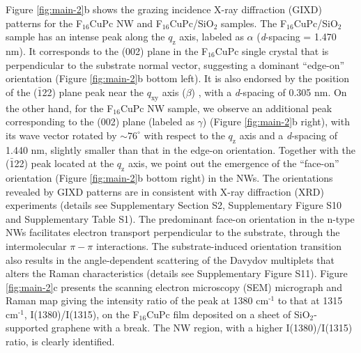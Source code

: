 \documentclass[journal=nalefd,manuscript=letter,email=true,hyperref=true,keywords=true]{achemso}
\begin{document}
Figure \ref{fig:main-2}b shows the grazing incidence X-ray diffraction
(GIXD) patterns for the F\(_{\text{16}}\)CuPc NW and F\(_{\text{16}}\)CuPc/SiO\(_{\text{2}}\)
samples. The F\(_{\text{16}}\)CuPc/SiO\(_{\text{2}}\) sample has an intense peak along the
\(q_{\mathrm{z}}\) axis, labeled as \(\alpha\) (\emph{d}-spacing = 1.470
nm). It corresponds to the (002) plane in the F\(_{\text{16}}\)CuPc single
crystal \cite{Yang_2009_F16_PTCDA} that is perpendicular to the
substrate normal vector, suggesting a dominant ``edge-on'' orientation
(Figure \ref{fig:main-2}b bottom left). It is also endorsed by the
position of the (\(\bar{1}\)22) plane peak near the \(q_{\mathrm{xy}}\)
axis (\(\beta\)) \cite{Yoon_2010_crystal_F16}, with a \emph{d}-spacing of
0.305 nm. On the other hand, for the F\(_{\text{16}}\)CuPc NW sample, we observe
an additional peak corresponding to the (002) plane (labeled as
\(\gamma\)) (Figure \ref{fig:main-2}b right), with its wave vector rotated
by \(\sim 76^{\circ}\) with respect to the \(q_{\mathrm{z}}\) axis and a
\emph{d}-spacing of 1.440 nm, slightly smaller than that in the edge-on
orientation. Together with the (\(\bar{1}\)22) peak located at the
\(q_{\mathrm{z}}\) axis, we point out the emergence of the ``face-on''
orientation (Figure \ref{fig:main-2}b bottom right) in the NWs. The
orientations revealed by GIXD patterns are in consistent with X-ray
diffraction (XRD) experiments (details see Supplementary Section S2,
Supplementary Figure S10 and Supplementary Table S1). The predominant
face-on orientation in the n-type NWs facilitates electron transport
perpendicular to the substrate, through the intermolecular \(\pi-\pi\)
interactions. The substrate-induced orientation transition also
results in the angle-dependent scattering of the Davydov multiplets
that alters the Raman characteristics
\cite{Cerdeira_2013_RamanF16} (details see Supplementary
Figure S11). Figure \ref{fig:main-2}c presents the scanning electron
microscopy (SEM) micrograph and Raman map giving the intensity
ratio of the peak at 1380 cm\(^{\text{-1}}\) to that at 1315 cm\(^{\text{-1}}\),
I(1380)/I(1315), on the F\(_{\text{16}}\)CuPc film deposited on a sheet of
SiO\(_{\text{2}}\)-supported graphene with a break. The NW region, with a higher
I(1380)/I(1315) ratio, is clearly identified.
\end{document}
